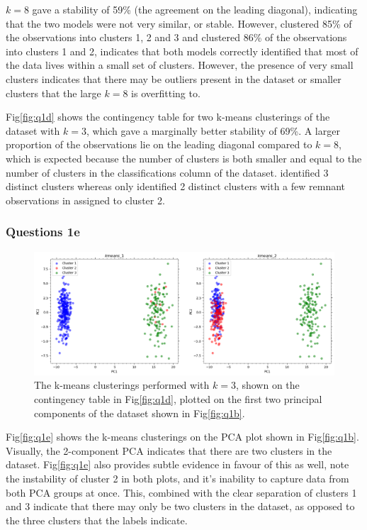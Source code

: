     $k=8$ gave a stability of 59\% (the agreement on the leading diagonal), indicating that the two models were
    not very similar, or stable.
    However,  clustered 85\% of the observations into clusters 1, 2 and 3 and 
    clustered 86\% of the observations into clusters 1 and 2, indicates that both models correctly identified that most of the data
    lives within a small set of clusters.
    However, the presence of very small clusters indicates that there may be outliers present in the dataset or smaller
    clusters that the large $k=8$ is overfitting to.

    Fig\eqref{fig:q1d} shows the contingency table for two k-means clusterings of the dataset with $k=3$, which gave a
    marginally better stability of 69\%.
    A larger proportion of the observations lie on the leading diagonal compared to $k=8$, which is expected because
    the number of clusters is both smaller and equal to the number of clusters in the classifications column of the
    dataset.
     identified 3 distinct clusters whereas  only identified 2 distinct
    clusters with a few remnant observations in assigned to cluster 2.

\subsubsection{Questions 1e}\label{subsubsec:q1e}
    \begin{figure}[htb]
    \centering
    \includegraphics[width=1\textwidth]{./figures/q1e}
    \caption{The k-means clusterings performed with $k=3$, shown on the contingency table in Fig\eqref{fig:q1d}, plotted
        on the first two principal components of the dataset shown in Fig\eqref{fig:q1b}.}
    \label{fig:q1e}
    \end{figure}

    Fig\eqref{fig:q1e} shows the k-means clusterings on the PCA plot shown in Fig\eqref{fig:q1b}.
    Visually, the 2-component PCA indicates that there are two clusters in the dataset.
    Fig\eqref{fig:q1e} also provides subtle evidence in favour of this as well, note the instability of cluster 2 in
    both plots, and it's inability to capture data from both PCA groups at once.
    This, combined with the clear separation of clusters 1 and 3 indicate that there may only be two clusters in the
    dataset, as opposed to the three clusters that the labels indicate.

